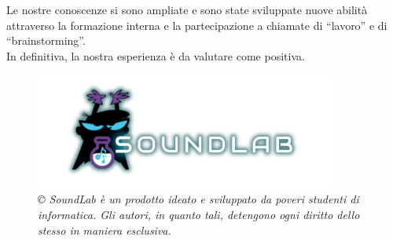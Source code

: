 \documentclass{article}
\begin{document}
	Le nostre conoscenze si sono ampliate e sono state sviluppate nuove abilità attraverso la formazione interna e la partecipazione a chiamate di “lavoro” e di “brainstorming”.\\
	In definitiva, la nostra esperienza è da valutare come positiva. 
	\newpage
	\vspace{0.5cm}
	\begin{figure}[H]
	\includegraphics[width=0.9\textwidth]{Immagini/logo_sfondo}
	\\
	\textit{© SoundLab è un prodotto ideato e sviluppato da poveri studenti di informatica. Gli autori, in quanto tali, detengono ogni diritto dello stesso in maniera esclusiva.}
	
	\end{figure}
	
		
\end{document}
